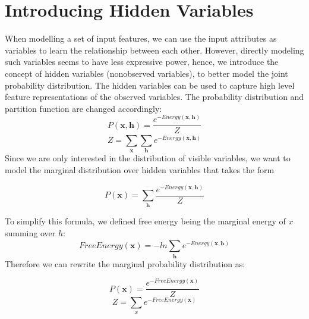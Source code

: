 \documentclass[11pt,fleqn, UTF8]{ctexbook} %
\begin{document}
\section{Introducing Hidden Variables}
When modelling a set of input features, we can use the input attributes as variables to learn the relationship between each other. However, directly modeling such variables seems to have less expressive power, hence, we introduce the concept of hidden variables (nonobserved variables), to better model the joint probability distribution. The hidden variables can be used to capture high level feature representations of the observed variables. The probability distribution and partition function are changed accordingly:
\begin{equation}\label{add1.2}
    P(\boldsymbol{x},\boldsymbol{h})=\frac{e^{-Energy(\boldsymbol{x},\boldsymbol{h})}}{Z}
\end{equation}
\begin{equation}\label{add1.3}
    Z=\sum_{\boldsymbol{x}}^{ }\sum_{\boldsymbol{h}}^{ }e^{-Energy(\boldsymbol{x},\boldsymbol{h})}
\end{equation}
Since we are only interested in the distribution of visible variables, we want to model the marginal distribution over hidden variables that takes the form

\begin{equation}\label{add1.4}
  P(\boldsymbol{x})=\sum_{\boldsymbol{h}}^{ }\frac{e^{-Energy(\boldsymbol{x},\boldsymbol{h})}}{Z}
\end{equation}

To simplify this formula, we defined free energy being the marginal energy of $x$ summing over $h$:
\begin{equation}\label{add1.5}
  FreeEnergy(\boldsymbol{x})=-ln\sum_{\boldsymbol{h}}^{ }e^{-Energy(\boldsymbol{x},\boldsymbol{h})}
\end{equation}
Therefore we can rewrite the marginal probability distribution as:

\begin{equation}\label{add1.6}
  P(\boldsymbol{x})=\frac{e^{-FreeEnergy(\boldsymbol{x})}}{Z}
\end{equation}
\begin{equation}\label{add1.7}
    Z=\sum_{x}e^{-FreeEnergy(\boldsymbol{x})}
\end{equation}
\end{document}
